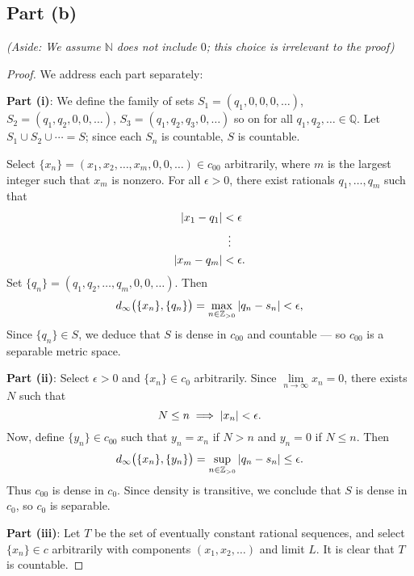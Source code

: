 \documentclass[11pt]{article}
\begin{document}

\subsection{Part (b)}

\textit{(Aside: We assume $\mathbb{N}$ does not include $0$; this choice is irrelevant to the proof)}

\begin{proof}
  We address each part separately:

  \textbf{Part (i)}: We define the family of sets $S_{1} = (q_{1}, 0, 0, 0, \ldots)$, $S_{2} = (q_{1}, q_{2}, 0, 0, \ldots)$, $S_{3} = (q_{1}, q_{2}, q_{3}, 0, \ldots)$ so on for all $q_{1}, q_{2}, \ldots \in \mathbb{Q}$. Let $S_{1} \cup S_{2} \cup \cdots = S$; since each $S_{n}$ is countable, $S$ is countable.

  Select $\{ x_{n} \} = (x_{1}, x_{2}, \ldots, x_{m}, 0, 0, \ldots) \in c_{00}$ arbitrarily, where $m$ is the largest integer such that $x_{m}$ is nonzero. For all $\epsilon > 0$, there exist rationals $q_{1}, \ldots, q_{m}$ such that
  \begin{align*}
    \abs{x_{1} - q_{1}} &< \epsilon \\
                        & \, \, \, \vdots \\
    \abs{x_{m} - q_{m}} &< \epsilon. \\
  \end{align*}
  Set $\{ q_{n} \} = (q_{1}, q_{2}, \ldots, q_{m}, 0, 0, \ldots)$. Then
  \[
    d_{\infty} \big( \{ x_{n} \}, \{ q_{n} \} \big) = \max\limits_{n \in \mathbb{Z}_{> 0}} \abs{q_{n} - s_{n}} < \epsilon,
  \]
  Since $\{ q_{n} \} \in S$, we deduce that $S$ is dense in $c_{00}$ and countable --- so $c_{00}$ is a separable metric space.

  \textbf{Part (ii)}: Select $\epsilon > 0$ and $\{ x_{n} \} \in c_{0}$ arbitrarily. Since $\lim\limits_{n \to \infty} x_{n} = 0$, there exists $N$ such that
  \[
    N \le n \implies \abs{x_{n}} < \epsilon.
  \]
  Now, define $\{ y_{n} \} \in c_{00}$ such that $y_{n} = x_{n}$ if $N > n$ and $y_{n} = 0$ if $N \le n$. Then
  \[
    d_{\infty} \big( \{ x_{n} \}, \{ y_{n} \} \big) = \sup\limits_{n \in \mathbb{Z}_{> 0}} \abs{q_{n} - s_{n}} \le \epsilon.
  \]
  Thus $c_{00}$ is dense in $c_{0}$. Since density is transitive, we conclude that $S$ is dense in $c_{0}$, so $c_{0}$ is separable.

  \textbf{Part (iii)}: Let $T$ be the set of eventually constant rational sequences, and select $\{ x_{n} \} \in c$ arbitrarily with components $(x_{1}, x_{2}, \ldots)$ and limit $L$. It is clear that $T$ is countable.


\end{proof}
\end{document}
